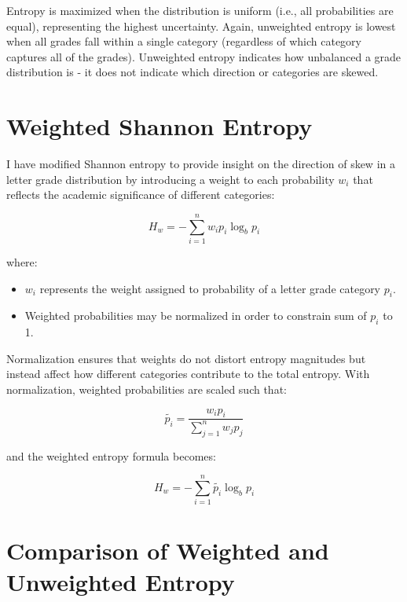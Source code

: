 \documentclass{article}
\begin{document}
Entropy is maximized when the distribution is uniform (i.e., all probabilities are equal), representing the highest uncertainty. Again, unweighted entropy is lowest when all grades fall within a single category (regardless of which category captures all of the grades). Unweighted entropy indicates how unbalanced a grade distribution is - it does not indicate which direction or categories are skewed.

\section{Weighted Shannon Entropy}

I have modified Shannon entropy to provide insight on the direction of skew in a letter grade distribution by introducing a weight to each probability \( w_i \) that reflects the academic significance of different categories:

\begin{equation}
H_w = - \sum_{i=1}^{n} w_i p_i \log_b p_i
\end{equation}

where:
\begin{itemize}
    \item \( w_i \) represents the weight assigned to probability of a letter grade category \( p_i \).
    \item Weighted probabilities may be normalized in order to constrain sum of \( p_i \) to 1.
\end{itemize}

Normalization ensures that weights do not distort entropy magnitudes but instead affect how different categories contribute to the total entropy. With normalization, weighted probabilities are scaled such that:

\begin{equation}
\tilde{p_i} = \frac{w_i p_i}{\sum_{j=1}^{n} w_j p_j}
\end{equation}

and the weighted entropy formula becomes:

\begin{equation}
H_w = - \sum_{i=1}^{n} \tilde{p_i} \log_b p_i
\end{equation}



\section{Comparison of Weighted and Unweighted Entropy}
\end{document}
